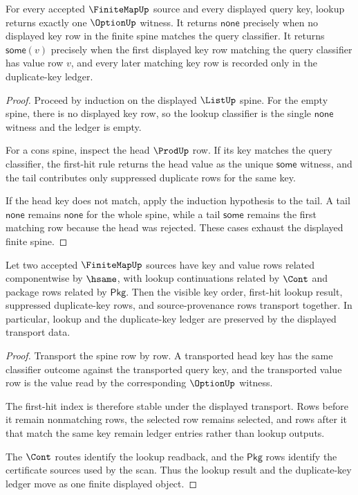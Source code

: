 \begin{theorem}
\label{thm:finitemap-lookup-option-exactness}
For every accepted $\FiniteMapUp$ source and every displayed query key, lookup returns exactly one $\OptionUp$ witness. It returns $\mathsf{none}$ precisely when no displayed key row in the finite spine matches the query classifier. It returns $\mathsf{some}(v)$ precisely when the first displayed key row matching the query classifier has value row $v$, and every later matching key row is recorded only in the duplicate-key ledger.
\end{theorem}
\begin{proof}
Proceed by induction on the displayed $\ListUp$ spine. For the empty spine, there is no displayed key row, so the lookup classifier is the single $\mathsf{none}$ witness and the ledger is empty.

For a cons spine, inspect the head $\ProdUp$ row. If its key matches the query classifier, the first-hit rule returns the head value as the unique $\mathsf{some}$ witness, and the tail contributes only suppressed duplicate rows for the same key.

If the head key does not match, apply the induction hypothesis to the tail. A tail $\mathsf{none}$ remains $\mathsf{none}$ for the whole spine, while a tail $\mathsf{some}$ remains the first matching row because the head was rejected. These cases exhaust the displayed finite spine.
\end{proof}

\begin{theorem}
\label{thm:finitemap-ledger-transport}
Let two accepted $\FiniteMapUp$ sources have key and value rows related componentwise by $\hsame$, with lookup continuations related by $\Cont$ and package rows related by $\mathsf{Pkg}$. Then the visible key order, first-hit lookup result, suppressed duplicate-key rows, and source-provenance rows transport together. In particular, lookup and the duplicate-key ledger are preserved by the displayed transport data.
\end{theorem}
\begin{proof}
Transport the spine row by row. A transported head key has the same classifier outcome against the transported query key, and the transported value row is the value read by the corresponding $\OptionUp$ witness.

The first-hit index is therefore stable under the displayed transport. Rows before it remain nonmatching rows, the selected row remains selected, and rows after it that match the same key remain ledger entries rather than lookup outputs.

The $\Cont$ routes identify the lookup readback, and the $\mathsf{Pkg}$ rows identify the certificate sources used by the scan. Thus the lookup result and the duplicate-key ledger move as one finite displayed object.
\end{proof}


